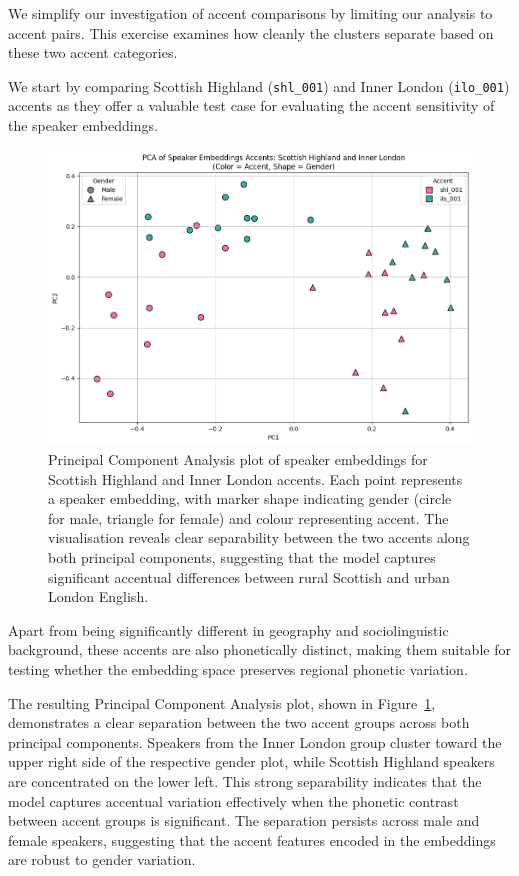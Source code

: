 \documentclass[conference]{IEEEtran}
\begin{document}
	We simplify our investigation of accent comparisons by limiting our analysis to accent pairs. This exercise examines how cleanly the clusters separate based on these two accent categories.
	
	We start by comparing  Scottish Highland (\texttt{shl\_001}) and Inner London (\texttt{ilo\_001}) accents as they offer a valuable test case for evaluating the accent sensitivity of the speaker embeddings. 
	
	\begin{figure}[H]
		\centering
		\includegraphics[width=1\linewidth]{img/img-cluster-shl-ilo}
		\caption{Principal Component Analysis plot of speaker embeddings for Scottish Highland and Inner London accents. Each point represents a speaker embedding, with marker shape indicating gender (circle for male, triangle for female) and colour representing accent. The visualisation reveals clear separability between the two accents along both principal components, suggesting that the model captures significant accentual differences between rural Scottish and urban London English.}
		\label{fig:img-cluster-shl-ilo}
	\end{figure}
	
	Apart from being significantly different in geography and sociolinguistic background, these accents are also phonetically distinct, making them suitable for testing whether the embedding space preserves regional phonetic variation.
	
	The resulting Principal Component Analysis plot, shown in Figure~\ref{fig:img-cluster-shl-ilo}, demonstrates a clear separation between the two accent groups across both principal components. Speakers from the Inner London group cluster toward the upper right side of the respective gender plot, while Scottish Highland speakers are concentrated on the lower left. This strong separability indicates that the model captures accentual variation effectively when the phonetic contrast between accent groups is significant. The separation persists across male and female speakers, suggesting that the accent features encoded in the embeddings are robust to gender variation.
	
\end{document}
